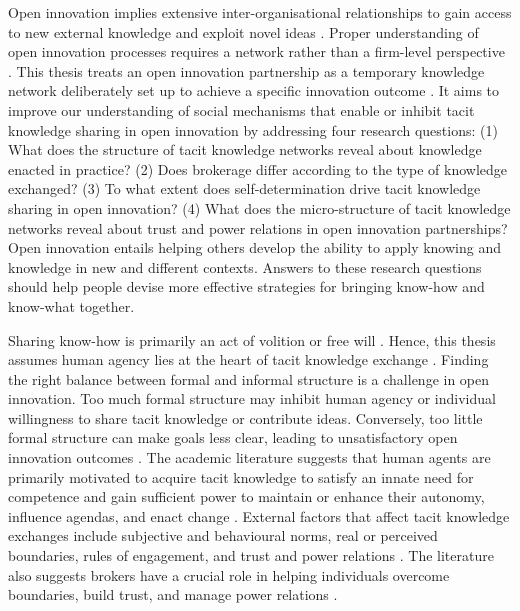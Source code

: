 Open innovation implies extensive inter-organisational relationships to gain access to new external knowledge and exploit novel ideas \citep{chiaroni2011open}. Proper understanding of open innovation processes requires a network rather than a firm-level perspective \citep{fichter2009innovation,martinez2014analysis,yun2016network}. This thesis treats an open innovation partnership as a temporary knowledge network deliberately set up to achieve a specific innovation outcome \citep{turner2003natureoftheproject,perez2013temporary,terhorst2018tacit}. It aims to improve our understanding of social mechanisms that enable or inhibit tacit knowledge sharing in open innovation by addressing four research questions: (1) What does the structure of tacit knowledge networks reveal about knowledge enacted in practice? (2) Does brokerage differ according to the type of knowledge exchanged? (3) To what extent does self-determination drive tacit knowledge sharing in open innovation? (4) What does the micro-structure of tacit knowledge networks reveal about trust and power relations in open innovation partnerships? Open innovation entails helping others develop the ability to apply knowing and knowledge in new and different contexts. Answers to these research questions should help people devise more effective strategies for bringing know-how and know-what together. \medskip

Sharing know-how is primarily an act of volition or free will \citep{polanyi1966tacit,hubrich2015embodiment,zhang2016critical}. Hence, this thesis assumes human agency lies at the heart of tacit knowledge exchange \citep{phelps2012knowledge}. Finding the right balance between formal and informal structure is a challenge in open innovation. Too much formal structure may inhibit human agency or individual willingness to share tacit knowledge or contribute ideas. Conversely, too little formal structure can make goals less clear, leading to unsatisfactory open innovation outcomes \citep{davis2010agency,nunes2020managing}. The academic literature suggests that human agents are primarily motivated to acquire tacit knowledge to satisfy an innate need for competence and gain sufficient power to maintain or enhance their autonomy, influence agendas, and enact change \citep{white1959motivation,bandura1977self,deci1989self}. External factors that affect tacit knowledge exchanges include subjective and behavioural norms, real or perceived boundaries, rules of engagement, and trust and power relations \citep{parsons1937structure,loyal2001agency}. The literature also suggests brokers have a crucial role in helping individuals overcome boundaries, build trust, and manage power relations \citep{obstfeld2014brokerage,quintane2016brokers}. \medskip

